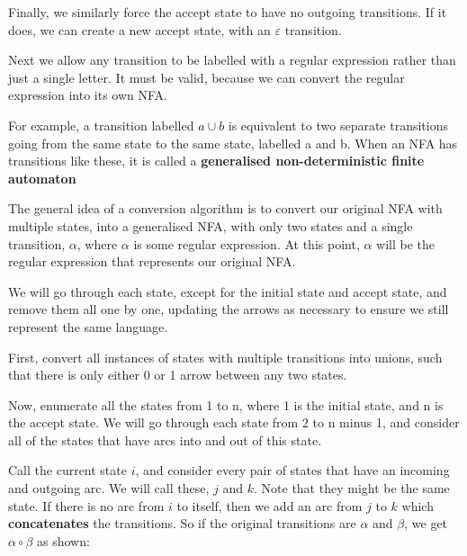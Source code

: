 \documentclass[11pt]{article}
\begin{document}
Finally, we similarly force the accept state to have no outgoing transitions.
If it does, we can create a new accept state, with an $\varepsilon$
transition.

Next we allow any transition to be labelled with a regular expression rather
than just a single letter. It must be valid, because we can convert the regular
expression into its own NFA.

For example, a transition labelled $a \cup b$ is equivalent to two separate
transitions going from the same state to the same state, labelled a and b. When
an NFA has transitions like these, it is called a \textbf{generalised
non-deterministic finite automaton}

\begin{figure}[H]
	\centering
\end{figure}

The general idea of a conversion algorithm is to convert our original NFA with
multiple states, into a generalised NFA, with only two states and a single
transition, $\alpha$, where $\alpha$ is some regular expression. At this point,
$\alpha$ will be the regular expression that represents our original NFA.

We will go through each state, except for the initial state and accept state,
and remove them all one by one, updating the arrows as necessary to ensure we
still represent the same language.

First, convert all instances of states with multiple transitions into unions,
such that there is only either 0 or 1 arrow between any two states.

Now, enumerate all the states from 1 to n, where 1 is the initial state, and n
is the accept state. We will go through each state from 2 to n minus 1, and
consider all of the states that have arcs into and out of this state.

Call the current state $i$, and consider every pair of states that have an
incoming and outgoing arc. We will call these, $j$ and $k$. Note that they might
be the same state. If there is no arc from $i$ to itself, then we add an arc
from $j$ to $k$ which \textbf{concatenates} the transitions. So if the original
transitions are $\alpha$ and $\beta$, we get $\alpha \circ \beta$ as shown:
\end{document}
